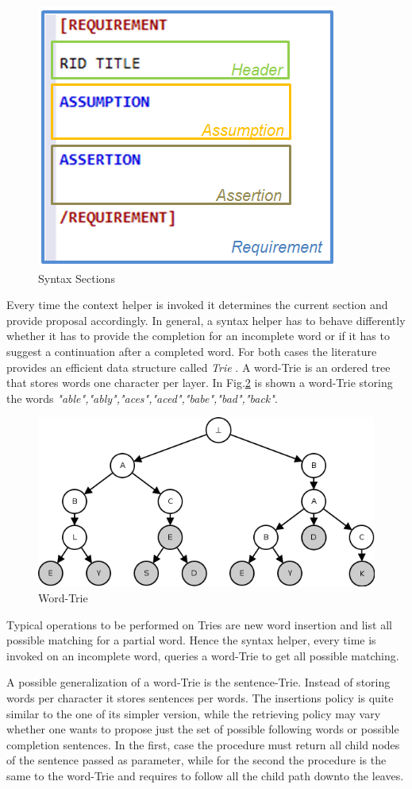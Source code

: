 \begin{figure}[!h]
\centering
\includegraphics[width=.4\textwidth]{Figs/resec.PNG}
\caption{Syntax Sections}
\label{fig:reqsec}
\end{figure}
Every time the context helper is invoked it determines the current section and provide proposal accordingly. In general, a syntax helper has to behave differently whether it has to provide the completion for an incomplete word or if it has to suggest a continuation after a completed word. For both cases the literature provides an efficient data structure called \textit{Trie} \citep{black2010trie}. A word-Trie is an ordered tree that stores words one character per layer. In Fig.\ref{fig:wtrie} is shown a word-Trie storing the words \textit{"able","ably","aces","aced","babe","bad","back"}.
\begin{figure}[!ht]
\centering
\includegraphics[width=.6\textwidth]{Figs/wtrie.png}
\caption{Word-Trie}
\label{fig:wtrie}
\end{figure}

Typical operations to be performed on Tries are new word insertion and list all possible matching for a partial word. Hence the syntax helper, every time is invoked on an incomplete word, queries a word-Trie to get all possible matching. 
\par A possible generalization of a word-Trie is the sentence-Trie. Instead of storing words per character it stores sentences per words. The insertions policy is quite similar to the one of its simpler version, while the retrieving policy may vary whether one wants to propose just the set of possible following words or possible completion sentences. In the first, case the procedure must return all child nodes of the sentence passed as parameter, while for the second the procedure is the same to the word-Trie and requires to follow all the child path downto the leaves.

